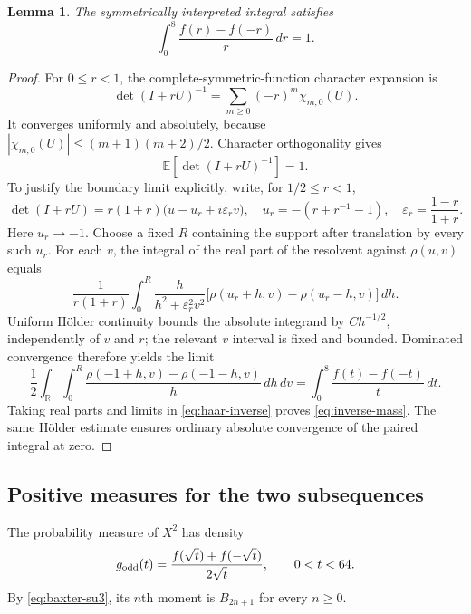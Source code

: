 \documentclass[11pt,a4paper]{article}
\newtheorem{lemma}[theorem]{Lemma}
\theoremstyle{remark}\newtheorem{remark}[theorem]{Remark}
\numberwithin{equation}{section}
\begin{document}
\begin{lemma}\label{lem:baxter-inverse-mass}
The symmetrically interpreted integral satisfies
\begin{equation}\label{eq:inverse-mass}
 \int_0^8\frac{f(r)-f(-r)}r\,dr=1.
\end{equation}
\end{lemma}
\begin{proof}
For $0\le r<1$, the complete-symmetric-function character expansion is
\[
 \det(I+rU)^{-1}=\sum_{m\ge0}(-r)^m\chi_{m,0}(U).
\]
It converges uniformly and absolutely, because
$|\chi_{m,0}(U)|\le(m+1)(m+2)/2$. Character orthogonality gives
\begin{equation}\label{eq:haar-inverse}
 \mathbb E[\det(I+rU)^{-1}]=1.
\end{equation}
To justify the boundary limit explicitly, write, for $1/2\le r<1$,
\[
 \det(I+rU)=r(1+r)\bigl(u-u_r+i\varepsilon_r v\bigr),
 \quad u_r=-(r+r^{-1}-1),\quad
 \varepsilon_r=\frac{1-r}{1+r}.
\]
Here $u_r\to-1$. Choose a fixed $R$ containing the support after
translation by every such $u_r$. For each $v$, the integral of the real
part of the resolvent against $\rho(u,v)$ equals
\[
 \frac1{r(1+r)}\int_0^R
 \frac{h}{h^2+\varepsilon_r^2v^2}
 \bigl[\rho(u_r+h,v)-\rho(u_r-h,v)\bigr]\,dh.
\]
Uniform H\"older continuity bounds the absolute integrand by
$C h^{-1/2}$, independently of $v$ and $r$; the relevant $v$ interval
is fixed and bounded. Dominated convergence therefore yields the
limit
\[
 \frac12\int_{\mathbb R}\int_0^R
 \frac{\rho(-1+h,v)-\rho(-1-h,v)}h\,dh\,dv
 =\int_0^8\frac{f(t)-f(-t)}t\,dt.
\]
Taking real parts and limits in \eqref{eq:haar-inverse} proves
\eqref{eq:inverse-mass}. The same H\"older estimate ensures ordinary
absolute convergence of the paired integral at zero.
\end{proof}

\subsection{Positive measures for the two subsequences}

The probability measure of $X^2$ has density
\begin{equation}\label{eq:baxter-odd-density}
 g_{\rm odd}(t)=\frac{f(\sqrt t)+f(-\sqrt t)}{2\sqrt t},
 \qquad 0<t<64.
\end{equation}
By \eqref{eq:baxter-su3}, its $n$th moment is $B_{2n+1}$ for every
$n\ge0$.
\end{document}
